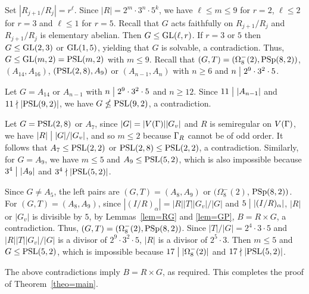 \documentclass[12pt]{article}
\def\a{\alpha} \def\b{\beta} \def\g{\gamma} \def\d{\delta} \def\e{\varepsilon}
\def\di{\bigm|} \def\lg{\langle} \def\rg{\rangle}
\def\PSL{\hbox{\rm PSL}}\def\PSU{\hbox{\rm PSU}}
\def\PSp{\hbox{\rm PSp}}\def\P\GammaL{\hbox{\rm P\Gamma L}} \def\ASIL{\hbox{\rm A\Sigma L}}
\begin{document}
Set $|R_{j+1}/R_j|=r^\ell$. Since $|R|=2^m\cdot3^n\cdot 5^k$, we have $\ell\leq m\leq 9$ for $r=2$, $\ell\leq 2$ for $r=3$
and $\ell\leq 1$ for $r=5$. Recall that $G$ acts faithfully on  $R_{j+1}/R_j$ and $R_{j+1}/R_j$ is elementary abelian.
Then $G\leq \hbox{\rm GL}(\ell,r)$. If $r=3$ or $5$ then $G\leq \hbox{\rm GL}(2,3)$ or $\hbox{\rm GL}(1,5)$, yielding that $G$ is solvable, a contradiction.
Thus, $G\leq \GL(m,2)=\PSL(m,2)$ with $m\leq 9$. Recall that $(G,T)=(\Omega^-_8(2),\PSp(8,2))$, $(A_{14},A_{16})$, $(\PSL(2,8),A_{9})$ or $(A_{n-1},A_n)$ with $n\geq 6$ and $n\di 2^9\cdot3^2\cdot5$.

Let $G=A_{14}$ or $A_{n-1}$ with $n\di 2^9\cdot3^2\cdot5$ and $n\geq 12$. Since $11\di |A_{n-1}|$ and $11\nmid |\PSL(9,2)|$, we have $G\nleq \PSL(9,2)$, a contradiction.

Let $G=\PSL(2,8)$ or $A_7$, since $|G|=|V(\Gamma)||G_v|$ and $R$ is semiregular on $V(\Gamma)$, we have $|R|\di |G|/|G_v|$, and so $m\leq 2$ because $\Gamma_R$ cannot be of odd order. It follows that $A_7\leq \PSL(2,2)$ or $\PSL(2,8)\leq \PSL(2,2)$, a contradiction. Similarly, for $G=A_9$, we have $m\leq 5$ and $A_9\leq \PSL(5,2)$, which is also impossible because $3^4\di |A_9|$ and $3^4\nmid |\PSL(5,2)|$.

Since $G\not=A_5$, the left pairs are $(G,T)=(A_8,A_9)$ or $(\Omega^-_8(2)$, $\PSp(8,2))$.
For $(G,T)=(A_8,A_9)$, since $|(I/R)_\a|=|R||T||G_v|/|G|$ and $5\di |(I/R)_\a|$, $|R|$ or $|G_v|$
is divisible by $5$, by Lemmas~\ref{lem=RG} and \ref{lem=GP}, $B=R\times G$, a contradiction. Thus,
$(G,T)=(\Omega^-_8(2),\PSp(8,2))$. Since $|T|/|G|=2^4\cdot3\cdot5$ and $|R||T||G_v|/|G|$ is a divisor
of $2^9\cdot 3^2\cdot 5$, $|R|$ is a divisor of $2^5\cdot3$. Then $m\leq 5$ and $G\leq \PSL(5,2)$,
which is impossible because $17\di |\Omega^-_8(2)|$ and $17\nmid |\PSL(5,2)|$.

The above contradictions imply $B=R\times G$, as required. This completes the proof of Theorem~\ref{theo=main}.
\end{document}

